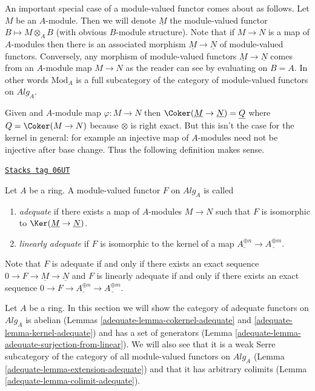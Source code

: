 \medskip\noindent
An important special case of a module-valued functor comes about as follows.
Let $M$ be an $A$-module. Then we will denote $\underline{M}$ the
module-valued functor $B \mapsto M \otimes_A B$ (with obvious $B$-module
structure). Note that if $M \to N$ is a map of $A$-modules then there is an
associated morphism $\underline{M} \to \underline{N}$ of module-valued
functors. Conversely, any morphism of module-valued functors
$\underline{M} \to \underline{N}$ comes from an $A$-module map $M \to N$
as the reader can see by evaluating on $B = A$. In other words
$\text{Mod}_A$ is a full
subcategory of the category of module-valued functors on $\textit{Alg}_A$.

\medskip\noindent
Given and $A$-module map $\varphi : M \to N$ then
$\Coker(\underline{M} \to \underline{N}) =
\underline{Q}$ where $Q = \Coker(M \to N)$ because $\otimes$
is right exact. But this isn't the case
for the kernel in general: for example an injective map of
$A$-modules need not be injective after base change. Thus the following
definition makes sense.

\begin{definition}
\label{adequate-definition-adequate-functor}
\href{https://stacks.math.columbia.edu/tag/06UT}{\texttt{Stacks tag 06UT}}

Let $A$ be a ring. A module-valued functor $F$ on $\textit{Alg}_A$ is
called
\begin{enumerate}
\item {\it adequate} if there exists a
map of $A$-modules $M \to N$ such that $F$ is isomorphic to
$\Ker(\underline{M} \to \underline{N})$.
\item {\it linearly adequate} if $F$ is isomorphic to the
kernel of a map $\underline{A^{\oplus n}} \to \underline{A^{\oplus m}}$.
\end{enumerate}
\end{definition}

Note that $F$ is adequate if and only if there exists an
exact sequence $0 \to F \to \underline{M} \to \underline{N}$ and
$F$ is linearly adequate if and only if there exists an exact sequence
$0 \to F \to \underline{A^{\oplus n}} \to \underline{A^{\oplus m}}$.

\medskip\noindent
Let $A$ be a ring. In this section we will show the category of adequate
functors on $\textit{Alg}_A$ is abelian
(Lemmas \ref{adequate-lemma-cokernel-adequate} and \ref{adequate-lemma-kernel-adequate})
and has a set of generators
(Lemma \ref{adequate-lemma-adequate-surjection-from-linear}).
We will also see that it is a weak Serre subcategory of the category
of all module-valued functors on $\textit{Alg}_A$
(Lemma \ref{adequate-lemma-extension-adequate})
and that it has arbitrary colimits
(Lemma \ref{adequate-lemma-colimit-adequate}).

